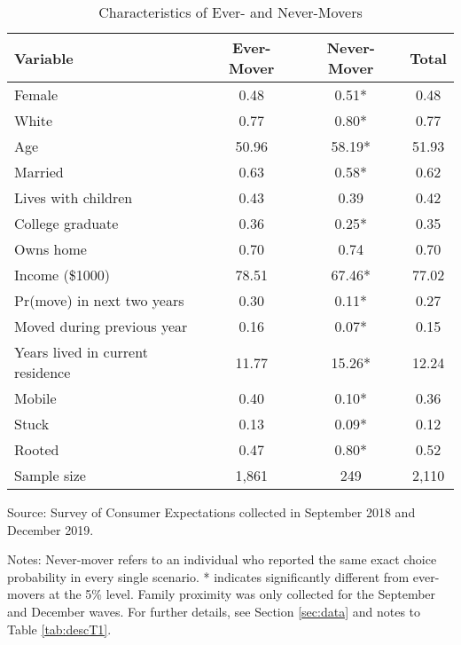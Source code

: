 \begin{table}[ht]
\caption{Characteristics of Ever- and Never-Movers}
\label{tab:descEverNeverMover}
\centering
\begin{threeparttable}
\begin{tabular}{lccc}
\toprule 
Variable & Ever-Mover & Never-Mover & Total \\
\midrule 
Female                                    & 0.48 & 0.51* & 0.48 \\ 
White                                     & 0.77 & 0.80* & 0.77 \\ 
Age                                       & 50.96 & 58.19* & 51.93 \\ 
Married                                   & 0.63 & 0.58* & 0.62 \\ 
Lives with children                       & 0.43 & 0.39 & 0.42 \\ 
College graduate                          & 0.36 & 0.25* & 0.35 \\ 
Owns home                                 & 0.70 & 0.74 & 0.70 \\ 
Income (\$1000)                          & 78.51 & 67.46* & 77.02 \\ 
Pr(move) in next two years                & 0.30 & 0.11* & 0.27 \\ 
Moved during previous year                & 0.16 & 0.07* & 0.15 \\ 
Years lived in current residence          & 11.77 & 15.26* & 12.24 \\ 
Mobile                                    & 0.40 & 0.10* & 0.36 \\ 
Stuck                                     & 0.13 & 0.09* & 0.12 \\ 
Rooted                                    & 0.47 & 0.80* & 0.52 \\ 
\midrule 
Sample size                      & 1,861 &   249 & 2,110 \\ 
\bottomrule 
\end{tabular} 
\footnotesize{Source: Survey of Consumer Expectations collected in September 2018 and December 2019. 
 
\bigskip{} 
 
Notes: Never-mover refers to an individual who reported the same exact choice probability in every single scenario. * indicates significantly different from ever-movers at the 5\% level. Family proximity was only collected for the September and December waves. For further details, see Section \ref{sec:data} and notes to Table \ref{tab:descT1}.}
\end{threeparttable} 
\end{table} 
